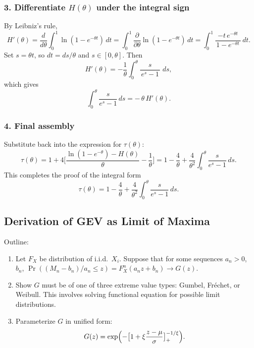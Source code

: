 \documentclass[11pt]{article}
\begin{document}
\subsubsection*{3. Differentiate $H(\theta)$ under the integral sign}

By Leibniz’s rule,
\[
H'(\theta)
=\frac{d}{d\theta}\!\int_{0}^{1}\ln(1 - e^{-\theta t})\,dt
=\int_{0}^{1}
\frac{\partial}{\partial\theta}
\ln(1 - e^{-\theta t})
\,dt
=\int_{0}^{1}
\frac{-t\,e^{-\theta t}}{\,1 - e^{-\theta t}\,}
\,dt.
\]
Set $s=\theta t$, so $dt=ds/\theta$ and $s\in[0,\theta]$.  Then
\[
H'(\theta)
=-\frac{1}{\theta}
\int_{0}^{\theta}\frac{s}{\,e^{s}-1\,}\;ds,
\]
which gives
\[
\int_{0}^{\theta}\frac{s}{e^{s}-1}\,ds
=-\,\theta\,H'(\theta).
\]

\subsubsection*{4. Final assembly}

Substitute back into the expression for $\tau(\theta)$:
\[
\tau(\theta)
=1
+4\Biggl[
\frac{\ln(1 - e^{-\theta}) - H(\theta)}{\theta}
-\frac{1}{\theta}
\Biggr]
=1
-\frac{4}{\theta}
+\frac{4}{\theta^{2}}
\int_{0}^{\theta}\frac{s}{e^{s}-1}\,ds.
\]
This completes the proof of the integral form
\[
\boxed{
\tau(\theta)
=1
-\frac{4}{\theta}
+\frac{4}{\theta^{2}}
\int_{0}^{\theta}\frac{s}{e^{s}-1}\,ds
}.
\]









\subsection{Derivation of GEV as Limit of Maxima}
\noindent Outline:
\begin{enumerate}
  \item Let \(F_X\) be distribution of i.i.d.\ \(X_i\). Suppose that for some sequences \(a_n>0\), \(b_n\), 
    \(\Pr((M_n - b_n)/a_n \le z) = F_X^n(a_n z + b_n)\to G(z)\).
  \item Show \(G\) must be of one of three extreme value types: Gumbel, Fréchet, or Weibull. This involves solving functional equation for possible limit distributions.
  \item Parameterize \(G\) in unified form:
    \[
      G(z) = \exp\Bigl(-\bigl[1 + \xi\frac{z - \mu}{\sigma}\bigr]_+^{-1/\xi}\Bigr).
    \]
\end{enumerate}
\end{document}
